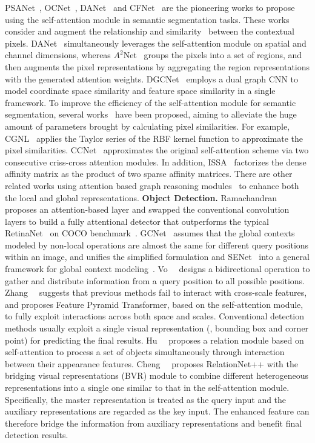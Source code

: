 PSANet~, OCNet~, DANet~ and CFNet~ are the pioneering works to propose using the self-attention module in semantic segmentation tasks. These works consider and augment the relationship and similarity~ between the contextual pixels. DANet~ simultaneously leverages the self-attention module on spatial and channel dimensions, whereas $A^2$Net~ groups the pixels into a set of regions, and then augments the pixel representations by aggregating the region representations with the generated attention weights. DGCNet~ employs a dual graph CNN to model coordinate space similarity and feature space similarity in a single framework. To improve the efficiency of the self-attention module for semantic segmentation, several works~ have been proposed, aiming to alleviate the huge amount of parameters brought by calculating pixel similarities. For example, CGNL~ applies the Taylor series of the RBF kernel function to approximate the pixel similarities. CCNet~ approximates the original self-attention scheme via two consecutive criss-cross attention modules. In addition, ISSA~ factorizes the dense affinity matrix as the product of two sparse affinity matrices. There are other related works using attention based graph reasoning modules~ to enhance both the local and global representations.
\textbf{Object Detection.}
Ramachandran~\etal~ proposes an attention-based layer and swapped the conventional convolution layers to build a fully attentional detector that outperforms the typical RetinaNet~ on COCO benchmark~. GCNet~ assumes that the global contexts modeled by non-local operations are almost the same for different query positions within an image, and unifies the simplified formulation and SENet~ into a general framework for global context modeling~.
Vo~\etal~ designs a bidirectional operation to gather and distribute information from a query position to all possible positions. Zhang~\etal~ suggests that previous methods fail to interact with cross-scale features, and proposes Feature Pyramid Transformer, based on the self-attention module, to fully exploit interactions across both space and scales.
Conventional detection methods usually exploit a single visual representation (\eg, bounding box and corner point) for predicting the final results. Hu~\etal~ proposes a relation module based on self-attention to process a set of objects simultaneously through interaction between their appearance features. Cheng~\etal~ proposes RelationNet++ with the bridging visual representations (BVR) module to combine different heterogeneous representations into a single one similar to that in the self-attention module. Specifically, the master representation is treated as the query input and the auxiliary representations are regarded as the key input. The enhanced feature can therefore bridge the information from auxiliary representations and benefit final detection results.
